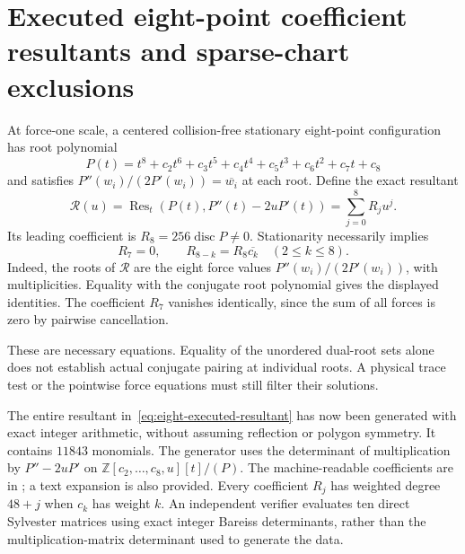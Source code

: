 \documentclass[11pt]{article}
\theoremstyle{remark}
\numberwithin{equation}{section}
\begin{document}
\section{Executed eight-point coefficient resultants and sparse-chart exclusions}
\label{sec:eight-executed-coefficient-resultants}

At force-one scale, a centered collision-free stationary eight-point
configuration has root polynomial
\[
 P(t)=t^8+c_2t^6+c_3t^5+c_4t^4+c_5t^3+c_6t^2+c_7t+c_8
\]
and satisfies $P''(w_i)/(2P'(w_i))=\overline{w_i}$ at each root.
Define the exact resultant
\begin{equation}\label{eq:eight-executed-resultant}
 \mathcal R(u)=\operatorname{Res}_t(P(t),P''(t)-2uP'(t))
              =\sum_{j=0}^8R_ju^j.
\end{equation}
Its leading coefficient is $R_8=256\operatorname{disc}P\ne0$.
Stationarity necessarily implies
\begin{equation}\label{eq:eight-executed-dual-equations}
 R_7=0,\qquad R_{8-k}=R_8\overline{c_k}\quad(2\le k\le8).
\end{equation}
Indeed, the roots of $\mathcal R$ are the eight force values
$P''(w_i)/(2P'(w_i))$, with multiplicities. Equality with the conjugate
root polynomial gives the displayed identities.
The coefficient $R_7$ vanishes identically, since the sum of all forces
is zero by pairwise cancellation.

These are necessary equations. Equality of the unordered dual-root
sets alone does not establish actual conjugate pairing at individual
roots. A physical trace test or the pointwise force equations must
still filter their solutions.

The entire resultant in~\eqref{eq:eight-executed-resultant} has now been
generated with exact integer arithmetic, without assuming reflection
or polygon symmetry. It contains $11843$ monomials. The generator
 uses the determinant of multiplication
by $P''-2uP'$ on $\mathbb Z[c_2,\ldots,c_8,u][t]/(P)$.
The machine-readable coefficients are in
; a text expansion is also
provided. Every coefficient $R_j$ has weighted degree $48+j$ when
$c_k$ has weight $k$. An independent verifier evaluates ten direct
Sylvester matrices using exact integer Bareiss determinants, rather
than the multiplication-matrix determinant used to generate the data.
\end{document}
